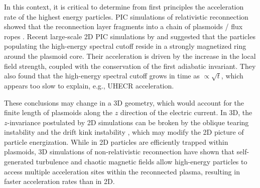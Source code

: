 \documentclass[twocolumn,twocolappendix]{aastex63}
\newcommand{\ls}{\textcolor{teal}}
\newcommand{\hz}{\textcolor{orange}}
\begin{document}
In this context, it is critical to determine from first principles the acceleration rate of the highest energy particles. PIC simulations of relativistic reconnection showed that the reconnection layer fragments into a chain of plasmoids / flux ropes \citep[e.g.,][]{sironi_16}. Recent large-scale 2D PIC simulations by \citet{petropoulou_18} and \citet{hakobyan_20} suggested that the particles populating the high-energy spectral cutoff reside in a strongly magnetized ring around the plasmoid core. Their acceleration is driven by the increase in the local field strength, coupled with the conservation of the first adiabatic invariant. They also found that the high-energy spectral cutoff grows in time as $\propto \sqrt{t}$, which appears too slow to explain, e.g., UHECR acceleration. 

These conclusions may change in a 3D geometry, which would account for the finite length of plasmoids along the $z$ direction of the electric current.
In 3D, the $z$-invariance postulated by 2D simulations can be broken by the oblique tearing instability \citep[e.g.,][]{daughton_11} and the drift kink instability \citep[e.g.,][]{zenitani_07}, which may modify the 2D picture of particle energization. While in 2D particles are efficiently trapped within plasmoids, 3D simulations of non-relativistic reconnection  \citep[][]{dahlin_2017,li_2019} have shown that 
 self-generated turbulence and chaotic magnetic fields allow high-energy particles to access multiple acceleration sites within the reconnected plasma, resulting in faster acceleration rates than in 2D.

\end{document}
